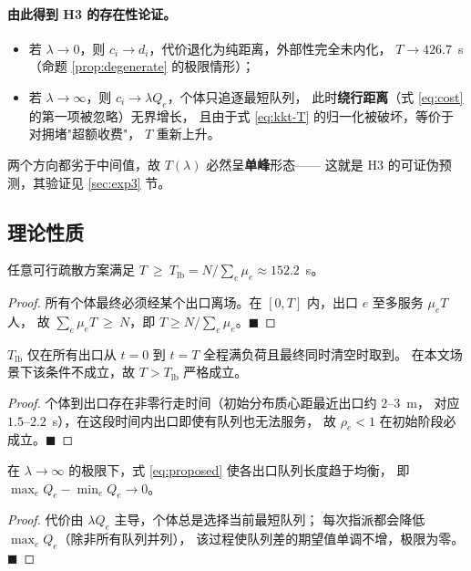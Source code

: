\paragraph{由此得到 H3 的存在性论证。}
\begin{itemize}
  \item 若 $\lambda\to0$，则 $c_i\to d_i$，代价退化为纯距离，外部性完全未内化，
        $T\to426.7$~s（命题 \ref{prop:degenerate} 的极限情形）；
  \item 若 $\lambda\to\infty$，则 $c_i\to\lambda Q_e$，个体只追逐最短队列，
        此时\textbf{绕行距离}（式 \eqref{eq:cost} 的第一项被忽略）无界增长，
        且由于式 \eqref{eq:kkt-T} 的归一化被破坏，等价于对拥堵"超额收费"，
        $T$ 重新上升。
\end{itemize}
两个方向都劣于中间值，故 $T(\lambda)$ 必然呈\textbf{单峰}形态——
这就是 H3 的可证伪预测，其验证见 \ref{sec:exp3} 节。

\subsection{理论性质}
\label{sec:props}

\begin{csfprop}[命题 3（容量下界）]
\label{prop:lb}
任意可行疏散方案满足 $T\ \ge\ T_{\mathrm{lb}}=N/\sum_{e}\mu_e\approx152.2$~s。
\end{csfprop}
\begin{proof}
所有个体最终必须经某个出口离场。在 $[0,T]$ 内，出口 $e$ 至多服务 $\mu_e T$ 人，
故 $\sum_e\mu_e T\ \ge\ N$，即 $T\ge N/\sum_e\mu_e$。\hfill$\blacksquare$
\end{proof}

\begin{csfprop}[命题 4（下界不可达）]
\label{prop:tight}
$T_{\mathrm{lb}}$ 仅在所有出口从 $t=0$ 到 $t=T$ 全程满负荷且最终同时清空时取到。
在本文场景下该条件不成立，故 $T>T_{\mathrm{lb}}$ 严格成立。
\end{csfprop}
\begin{proof}
个体到出口存在非零行走时间（初始分布质心距最近出口约 $2$--$3$~m，
对应 $1.5$--$2.2$~s），在这段时间内出口即使有队列也无法服务，
故 $\rho_e<1$ 在初始阶段必成立。\hfill$\blacksquare$
\end{proof}

\begin{csfprop}[命题 5（均衡倾向）]
\label{prop:balance}
在 $\lambda\to\infty$ 的极限下，式 \eqref{eq:proposed} 使各出口队列长度趋于均衡，
即 $\max_e Q_e-\min_e Q_e\to0$。
\end{csfprop}
\begin{proof}
代价由 $\lambda Q_e$ 主导，个体总是选择当前最短队列；
每次指派都会降低 $\max_e Q_e$（除非所有队列并列），
该过程使队列差的期望值单调不增，极限为零。\hfill$\blacksquare$
\end{proof}

